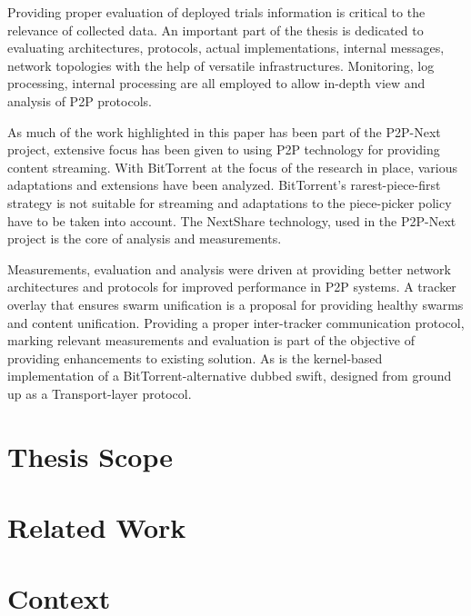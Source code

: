 Providing proper evaluation of deployed trials information is critical to the
relevance of collected data. An important part of the thesis is dedicated to
evaluating architectures, protocols, actual implementations, internal
messages, network topologies with the help of versatile infrastructures.
Monitoring, log processing, internal processing are all employed to allow
in-depth view and analysis of P2P protocols.

As much of the work highlighted in this paper has been part of the
P2P-Next project, extensive focus has been given to using P2P technology for
providing content streaming. With BitTorrent at the focus of the research in
place, various adaptations and extensions have been analyzed. BitTorrent's
rarest-piece-first strategy is not suitable for streaming and adaptations to
the piece-picker policy have to be taken into account. The NextShare
technology, used in the P2P-Next project is the core of analysis and
measurements.

Measurements, evaluation and analysis were driven at providing better network
architectures and protocols for improved performance in P2P systems. A tracker
overlay that ensures swarm unification is a proposal for providing healthy
swarms and content unification. Providing a proper inter-tracker communication
protocol, marking relevant measurements and evaluation is part of the objective
of providing enhancements to existing solution. As is the kernel-based
implementation of a BitTorrent-alternative dubbed swift, designed from ground
up as a Transport-layer protocol.

\section{Thesis Scope}
\label{sec:intro:scope}


\section{Related Work}
\label{sec:intro:related}


\section{Context}
\label{sec:intro:context}

